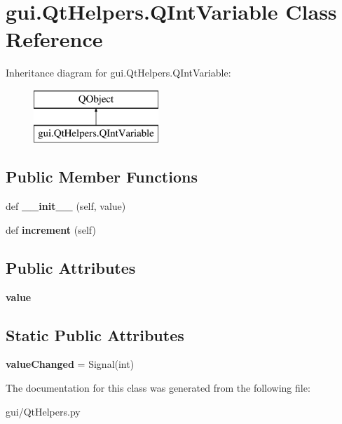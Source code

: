 \hypertarget{classgui_1_1_qt_helpers_1_1_q_int_variable}{}\section{gui.\+Qt\+Helpers.\+Q\+Int\+Variable Class Reference}
\label{classgui_1_1_qt_helpers_1_1_q_int_variable}
Inheritance diagram for gui.\+Qt\+Helpers.\+Q\+Int\+Variable\+:\begin{figure}[H]
\begin{center}
\leavevmode
\includegraphics[height=2.000000cm]{d8/da3/classgui_1_1_qt_helpers_1_1_q_int_variable}
\end{center}
\end{figure}
\subsection*{Public Member Functions}
\begin{DoxyCompactItemize}
\item 
\mbox{\label{classgui_1_1_qt_helpers_1_1_q_int_variable_a9d9ec183c8536413c72cedf980a15548}} 
def {\bfseries \+\_\+\+\_\+init\+\_\+\+\_\+} (self, value)
\item 
\mbox{\label{classgui_1_1_qt_helpers_1_1_q_int_variable_a39bcc5a732c5d75229ca9b4000063e74}} 
def {\bfseries increment} (self)
\end{DoxyCompactItemize}
\subsection*{Public Attributes}
\begin{DoxyCompactItemize}
\item 
\mbox{\label{classgui_1_1_qt_helpers_1_1_q_int_variable_ade62e97b5df1090bb4b77d0c13359773}} 
{\bfseries value}
\end{DoxyCompactItemize}
\subsection*{Static Public Attributes}
\begin{DoxyCompactItemize}
\item 
\mbox{\label{classgui_1_1_qt_helpers_1_1_q_int_variable_a4e9d651fd25d9529bc70cf83e14d978d}} 
{\bfseries value\+Changed} = Signal(int)
\end{DoxyCompactItemize}


The documentation for this class was generated from the following file\+:\begin{DoxyCompactItemize}
\item 
gui/Qt\+Helpers.\+py\end{DoxyCompactItemize}
